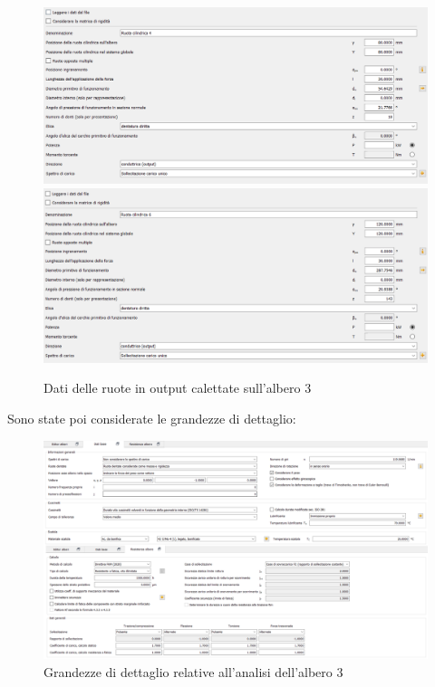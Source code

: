 \begin{figure}[h]
    \centering
    \includegraphics[scale=0.27]{Immagini/Ruota4Albero3.png}
    \includegraphics[scale=0.27]{Immagini/Ruota6Albero3.png}
    \caption{Dati delle ruote in output calettate sull'albero 3}
    \label{fig:Ruota1Albero2}
\end{figure}

\newpage
Sono state poi considerate le grandezze di dettaglio:
\begin{figure}[h]
    \centering
    \includegraphics[scale=0.45]{Immagini/DettagliAlbero3.png}
    \caption{Grandezze di dettaglio relative all'analisi dell'albero 3}
    \label{fig:DettagliAlbero3}
\end{figure}

